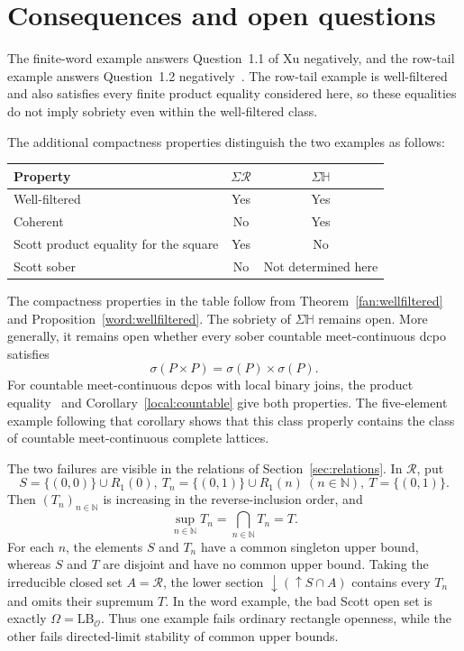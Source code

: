 \documentclass[10pt,a4paper]{article}
\theoremstyle{definition}
\newcommand{\N}{\mathbb N}
\newcommand{\HH}{\mathbb H}
\newcommand{\RR}{\mathcal R}
\begin{document}
\section{Consequences and open questions}\label{sec:boundaries}
The finite-word example answers Question~1.1 of Xu negatively, and the row-tail example answers Question~1.2 negatively~\cite{Xu}. The row-tail example is well-filtered and also satisfies every finite product equality considered here, so these equalities do not imply sobriety even within the well-filtered class.


The additional compactness properties distinguish the two examples as follows:
\begin{center}
\begin{tabular}{@{}lcc@{}}
\toprule
Property & $\Sigma\RR$ & $\Sigma\HH$\\
\midrule
Well-filtered & Yes & Yes\\
Coherent & No & Yes\\
Scott product equality for the square & Yes & No\\
Scott sober & No & Not determined here\\
\bottomrule
\end{tabular}
\end{center}
The compactness properties in the table follow from Theorem~\ref{fan:wellfiltered} and Proposition~\ref{word:wellfiltered}. The sobriety of $\Sigma\HH$ remains open. More generally, it remains open whether every sober countable meet-continuous dcpo satisfies
\[
 \sigma(P\times P)=\sigma(P)\times\sigma(P).
\]
For countable meet-continuous dcpos with local binary joins, the product equality~\cite[Corollary~4.2]{Xu} and Corollary~\ref{local:countable} give both properties. The five-element example following that corollary shows that this class properly contains the class of countable meet-continuous complete lattices.

The two failures are visible in the relations of Section~\ref{sec:relations}. In $\RR$, put
\[
 S=\{(0,0)\}\cup R_1(0),~
 T_n=\{(0,1)\}\cup R_1(n)~(n\in\N),~
 T=\{(0,1)\}.
\]
Then $(T_n)_{n\in\N}$ is increasing in the reverse-inclusion order, and
\[
 \sup_{n\in\N}T_n=\bigcap_{n\in\N}T_n=T.
\]
For each $n$, the elements $S$ and $T_n$ have a common singleton upper bound, whereas $S$ and $T$ are disjoint and have no common upper bound. Taking the irreducible closed set $A=\RR$, the lower section ${\downarrow}({\uparrow} S\cap A)$ contains every $T_n$ and omits their supremum $T$. In the word example, the bad Scott open set is exactly $\Omega=\mathrm{LB}_{\mathcal O}$. Thus one example fails ordinary rectangle openness, while the other fails directed-limit stability of common upper bounds.
\end{document}
